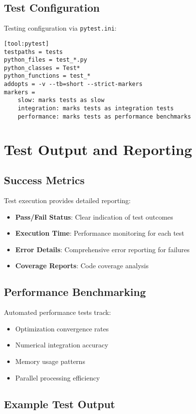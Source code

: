 \documentclass[12pt]{article}
\begin{document}
\subsection{Test Configuration}

Testing configuration via \texttt{pytest.ini}:
\begin{lstlisting}[caption=PyTest Configuration]
[tool:pytest]
testpaths = tests
python_files = test_*.py
python_classes = Test*
python_functions = test_*
addopts = -v --tb=short --strict-markers
markers =
    slow: marks tests as slow
    integration: marks tests as integration tests
    performance: marks tests as performance benchmarks
\end{lstlisting}

\section{Test Output and Reporting}

\subsection{Success Metrics}

Test execution provides detailed reporting:
\begin{itemize}
\item \textbf{Pass/Fail Status}: Clear indication of test outcomes
\item \textbf{Execution Time}: Performance monitoring for each test
\item \textbf{Error Details}: Comprehensive error reporting for failures
\item \textbf{Coverage Reports}: Code coverage analysis
\end{itemize}

\subsection{Performance Benchmarking}

Automated performance tests track:
\begin{itemize}
\item Optimization convergence rates
\item Numerical integration accuracy
\item Memory usage patterns
\item Parallel processing efficiency
\end{itemize}

\subsection{Example Test Output}
\end{document}
